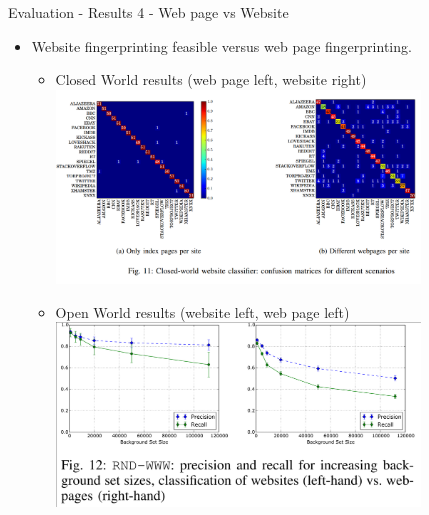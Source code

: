 \documentclass{beamer}
\begin{document}
\begin{frame}{Evaluation - Results 4 - Web page vs Website}
\begin{itemize}
\item Website fingerprinting feasible versus web page fingerprinting.
\begin{itemize}
\item Closed World results (web page left, website right)
\includegraphics[width=0.8\textwidth,trim={0 5cm 0 0},clip]{Website1}

\item Open World results (website left, web page left)
\includegraphics[width=0.8\textwidth,trim={0.1cm 0 0 0.1cm},clip]{Website2}

\end{itemize}
\end{itemize}
\end{frame}
\end{document}
